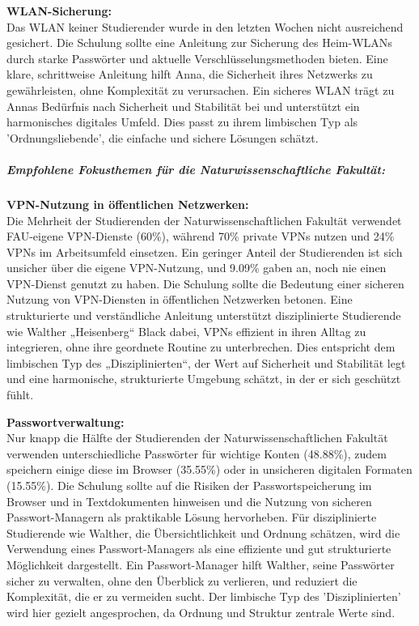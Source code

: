 \documentclass[german,report]{i1thesis}
\begin{document}
\textbf{WLAN-Sicherung:}\\
Das WLAN keiner Studierender wurde in den letzten Wochen nicht ausreichend gesichert. Die Schulung sollte eine Anleitung zur Sicherung des Heim-WLANs durch starke Passwörter und aktuelle Verschlüsselungsmethoden bieten. Eine klare, schrittweise Anleitung hilft Anna, die Sicherheit ihres Netzwerks zu gewährleisten, ohne Komplexität zu verursachen. Ein sicheres WLAN trägt zu Annas Bedürfnis nach Sicherheit und Stabilität bei und unterstützt ein harmonisches digitales Umfeld. Dies passt zu ihrem limbischen Typ als 'Ordnungsliebende', die einfache und sichere Lösungen schätzt.


\subparagraph{Empfohlene Fokusthemen für die Naturwissenschaftliche Fakultät:} 
\mbox{}

\textbf{VPN-Nutzung in öffentlichen Netzwerken:}\\
Die Mehrheit der Studierenden der Naturwissenschaftlichen Fakultät verwendet FAU-eigene VPN-Dienste (60\%), während 70\% private VPNs nutzen und 24\% VPNs im Arbeitsumfeld einsetzen. Ein geringer Anteil der Studierenden ist sich unsicher über die eigene VPN-Nutzung, und 9.09\% gaben an, noch nie einen VPN-Dienst genutzt zu haben. Die Schulung sollte die Bedeutung einer sicheren Nutzung von VPN-Diensten in öffentlichen Netzwerken betonen. Eine strukturierte und verständliche Anleitung unterstützt disziplinierte Studierende wie Walther „Heisenberg“ Black dabei, VPNs effizient in ihren Alltag zu integrieren, ohne ihre geordnete Routine zu unterbrechen. Dies entspricht dem limbischen Typ des „Disziplinierten“, der Wert auf Sicherheit und Stabilität legt und eine harmonische, strukturierte Umgebung schätzt, in der er sich geschützt fühlt.

\textbf{Passwortverwaltung:}\\
Nur knapp die Hälfte der Studierenden der Naturwissenschaftlichen Fakultät verwenden unterschiedliche Passwörter für wichtige Konten (48.88\%), zudem speichern einige diese im Browser (35.55\%) oder in unsicheren digitalen Formaten (15.55\%). Die Schulung sollte auf die Risiken der Passwortspeicherung im Browser und in Textdokumenten hinweisen und die Nutzung von sicheren Passwort-Managern als praktikable Lösung hervorheben. Für disziplinierte Studierende wie Walther, die Übersichtlichkeit und Ordnung schätzen, wird die Verwendung eines Passwort-Managers als eine effiziente und gut strukturierte Möglichkeit dargestellt. Ein Passwort-Manager hilft Walther, seine Passwörter sicher zu verwalten, ohne den Überblick zu verlieren, und reduziert die Komplexität, die er zu vermeiden sucht. Der limbische Typ des 'Disziplinierten' wird hier gezielt angesprochen, da Ordnung und Struktur zentrale Werte sind.
\end{document}
